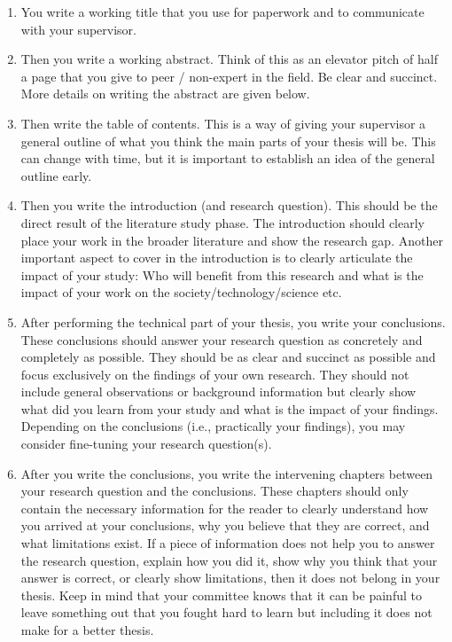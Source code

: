 \documentclass{article}
\begin{document}
\begin{enumerate}
    \item You write a working title that you use for paperwork and to communicate with your supervisor.
    \item Then you write a working abstract. Think of this as an elevator pitch of half a page that you give to peer / non-expert in the field. Be clear and succinct. More details on writing the abstract are given below. 
    \item Then write the table of contents. This is a way of giving your supervisor a general outline of what you think the main parts of your thesis will be. This can change with time, but it is important to establish an idea of the general outline early.
    \item Then you write the introduction (and research question). This should be the direct result of the literature study phase. The introduction should clearly place your work in the broader literature and show the research gap. Another important aspect to cover in the introduction is to clearly articulate the impact of your study: Who will benefit from this research and what is the impact of your work on the society/technology/science etc. 
    \item After performing the technical part of your thesis, you write your conclusions. These conclusions should answer your research question as concretely and completely as possible. They should be as clear and succinct as possible and focus exclusively on the findings of your own research. They should not include general observations or background information but clearly show what did you learn from your study and what is the impact of your findings. Depending on the conclusions (i.e., practically your findings), you may consider fine-tuning your research question(s).
    \item After you write the conclusions, you write the intervening chapters between your research question and the conclusions. These chapters should only contain the necessary information for the reader to clearly understand how you arrived at your conclusions, why you believe that they are correct, and what limitations exist. If a piece of information does not help you to answer the research question, explain how you did it, show why you think that your answer is correct, or clearly show limitations, then it does not belong in your thesis. Keep in mind that your committee knows that it can be painful to leave something out that you fought hard to learn but including it does not make for a better thesis. 

\end{enumerate}
\end{document}
